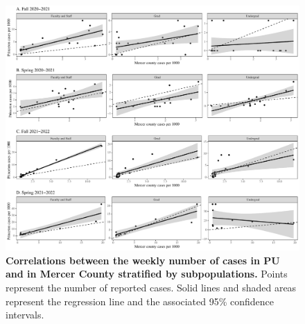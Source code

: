 \documentclass[12pt]{article}
\begin{document}
\begin{figure}[!htp]
\includegraphics[width=\textwidth]{../figure_princeton_new/figure_princeton_correlation_per_1000.pdf}
\caption{
\textbf{Correlations between the weekly number of cases in PU and in Mercer County stratified by subpopulations.}
Points represent the number of reported cases.
Solid lines and shaded areas represent the regression line and the associated 95\% confidence intervals.
}
\end{figure}

\pagebreak
\end{document}
